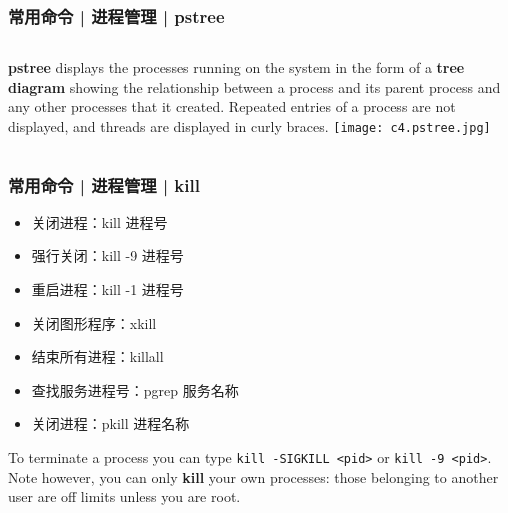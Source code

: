 \begin{frame}
  \frametitle{常用命令 | 进程管理 | pstree}
  \begin{columns}
  \textbf{pstree} displays the processes running on the system in the form of a \textbf{tree diagram} showing the relationship between a process and its parent process and any other processes that it created. Repeated entries of a process are not displayed, and threads are displayed in curly braces.
    \texttt{[image: c4.pstree.jpg]}
  \end{columns}
\end{frame}

\begin{frame}[fragile]
  \frametitle{常用命令 | 进程管理 | kill}
  \begin{itemize}
    \item 关闭进程：kill 进程号
    \item 强行关闭：kill -9 进程号
    \item 重启进程：kill -1 进程号
    \item 关闭图形程序：xkill
    \item 结束所有进程：killall
    \item 查找服务进程号：pgrep 服务名称
    \item 关闭进程：pkill 进程名称
  \end{itemize}
  To terminate a process you can type \verb|kill -SIGKILL <pid>| or \verb|kill -9 <pid>|. Note however, you can only \textbf{kill} your own processes: those belonging to another user are off limits unless you are root.
\end{frame}

